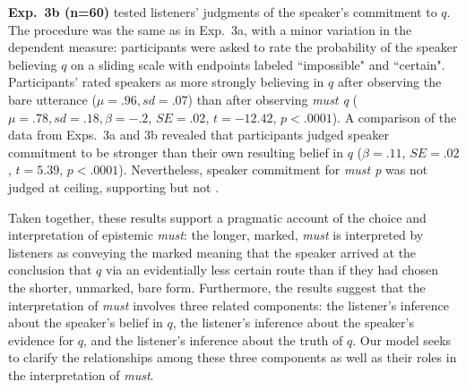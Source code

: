 \documentclass[11pt]{article}
\begin{document}
\textbf{Exp.~3b (n=60)} tested listeners' judgments of the speaker's commitment to $q$. The procedure was the same as in Exp.~3a, with a minor variation in the dependent measure: participants were asked to rate the probability of the speaker believing $q$ on a sliding scale with endpoints labeled ``impossible" and ``certain". Participants' rated speakers as more strongly believing in $q$ after observing the bare utterance ($\mu=.96,sd=.07$) than after observing  \emph{must q}  ($\mu=.78,sd=.18, \beta=-.2$, $SE=.02$, $t=-12.42$, $p<.0001$). A comparison of the data from Exps.~3a and 3b revealed that participants judged speaker commitment to be stronger than their own resulting belief in $q$ ($\beta=.11$, $SE=.02$, $t=5.39$, $p<.0001$). Nevertheless, speaker commitment for \emph{must p} was not judged at ceiling, supporting  but not .



Taken together, these results support a pragmatic account of the choice and interpretation of epistemic \emph{must}: the longer, marked, \emph{must} is interpreted by listeners as conveying the marked meaning that the speaker arrived at the conclusion that $q$ via an evidentially less certain route than if they had chosen the shorter, unmarked, bare form. Furthermore, the results suggest that the interpretation of \emph{must} involves three related components: the listener's inference about the speaker's belief in $q$, the listener's inference about the speaker's evidence for $q$, and the listener's inference about the truth  of $q$. Our model seeks to clarify the relationships among these three components as well as their roles in the interpretation of \emph{must}. %
\end{document}
